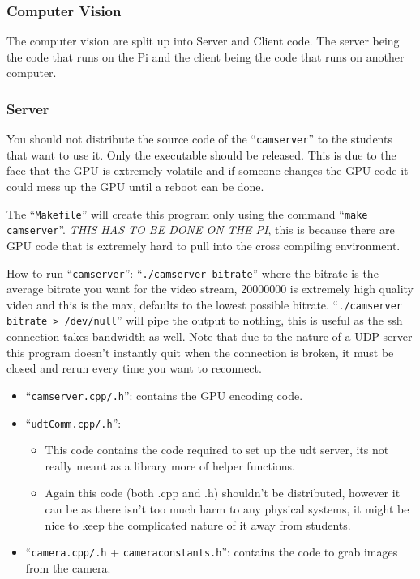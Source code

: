 \documentclass{article}
\begin{document}
\subsubsection{Computer Vision}
The computer vision are split up into Server and Client code. The server being the code that runs on the Pi and the client being the code that runs on another computer.
\subsubsection{Server}
You should not distribute the source code of the ``{\tt camserver}'' to the students that want to use it. Only the executable should be released. This is due to the face that the GPU is extremely volatile and if someone changes the GPU code it could mess up the GPU until a reboot can be done.

The ``{\tt Makefile}'' will create this program only using the command ``{\tt make camserver}''. \emph{THIS HAS TO BE DONE ON THE PI}, this is because there are GPU code that is extremely hard to pull into the cross compiling environment.

How to run ``{\tt camserver}'':  ``{\tt ./camserver bitrate}'' where the bitrate is the average bitrate you want for the video stream, 20000000 is extremely high quality video and this is the max, defaults to the lowest possible bitrate. ``{\tt ./camserver bitrate > /dev/null}'' will pipe the output to nothing, this is useful as the ssh connection takes bandwidth as well. Note that due to the nature of a UDP server this program doesn't instantly quit when the connection is broken, it must be closed and rerun every time you want to reconnect.

\begin{itemize}
    \item ``{\tt camserver.cpp/.h}'': contains the GPU encoding code.
    \item ``{\tt udtComm.cpp/.h}'':
    \begin{itemize}
        \item This code contains the code required to set up the udt server, its not really meant as a library more of helper functions.
        \item Again this code (both .cpp and .h) shouldn't be distributed, however it can be as there isn't too much harm to any physical systems, it might be nice to keep the complicated nature of it away from students.
    \end{itemize}
    \item ``{\tt camera.cpp/.h} + {\tt cameraconstants.h}'': contains the code to grab images from the camera.
\end{itemize}
\end{document}
